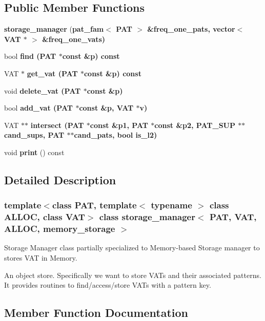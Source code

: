 \subsection*{Public Member Functions}
\begin{CompactItemize}
\item 
\textbf{storage\_\-manager} (\bf{pat\_\-fam}$<$ PAT $>$ \&freq\_\-one\_\-pats, vector$<$ VAT $\ast$ $>$ \&freq\_\-one\_\-vats)\label{classstorage__manager_3_01PAT_00_01VAT_00_01ALLOC_00_01memory__storage_01_4_2a80da96fd30322e280e4cc762350249}

\item 
bool \bf{find} (PAT $\ast$const \&p) const 
\item 
VAT $\ast$ \bf{get\_\-vat} (PAT $\ast$const \&p) const 
\item 
void \bf{delete\_\-vat} (PAT $\ast$const \&p)
\item 
bool \bf{add\_\-vat} (PAT $\ast$const \&p, VAT $\ast$v)
\item 
VAT $\ast$$\ast$ \bf{intersect} (PAT $\ast$const \&p1, PAT $\ast$const \&p2, \bf{PAT\_\-SUP} $\ast$$\ast$cand\_\-sups, PAT $\ast$$\ast$cand\_\-pats, bool is\_\-l2)
\item 
void \textbf{print} () const \label{classstorage__manager_3_01PAT_00_01VAT_00_01ALLOC_00_01memory__storage_01_4_91a69acea82c668e1dd2bca36b085f6d}

\end{CompactItemize}


\subsection{Detailed Description}
\subsubsection*{template$<$class PAT, template$<$ typename $>$ class ALLOC, class VAT$>$ class storage\_\-manager$<$ PAT, VAT, ALLOC, memory\_\-storage $>$}

Storage Manager class partially specialized to Memory-based Storage manager to stores VAT in Memory. 

An object store. Specifically we want to store VATs and their associated patterns. It provides routines to find/access/store VATs with a pattern key. 



\subsection{Member Function Documentation}

